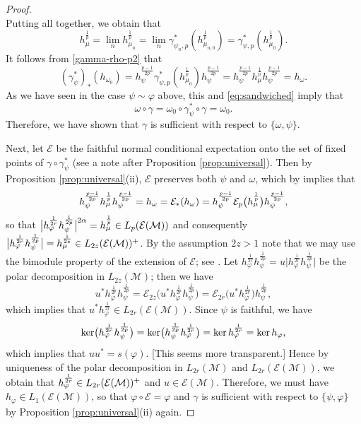 \documentclass[12pt]{article}
\theoremstyle{definition}
\theoremstyle{remark}
\numberwithin{equation}{section}
\def\cE{\mathcal E}
\def\Me{\mathcal M}
\def\ffi{\varphi}
\begin{document}
\begin{proof}
\[\]
Putting all together, we obtain that 
\[
h_\mu^{\frac1p}=\lim_n h_{\mu_n}^{\frac1p}=\lim_n
\gamma^*_{\psi_{n},p}(h_{\mu_{n,0}}^{\frac1p})=\gamma^*_{\psi,p}(h_{\mu_0}^{\frac1p}).
\]
It follows from \eqref{gamma-rho-p2} that 
\[
(\gamma^*_{\psi})_*(h_{\omega_0})=
h_{\psi}^{\frac{p-1}{2p}}\gamma^*_{\psi,p}(h_{\mu_0}^{\frac1p})h_{\psi}^{\frac{p-1}{2p}}=
h_{\psi}^{\frac{p-1}{2p}}h_\mu^{\frac1p}h_{\psi}^{\frac{p-1}{2p}}=h_\omega.
\]
As we have seen {\color{red}in the case $\psi\sim \ffi$ above,} this and \eqref{eq:sandwiched} imply that
\[
\omega\circ\gamma= \omega_0\circ \gamma_\psi^*\circ\gamma=\omega_0.
\]
{\color{red}Therefore, we have shown that $\gamma$ is sufficient with respect to $\{\omega,\psi\}$.}

Next, let $\mathcal E$ be the faithful  normal conditional expectation onto the
set of fixed points of $\gamma\circ\gamma^*_\psi$ (see a note after Proposition \ref{prop:universal}). Then
by Proposition \ref{prop:universal}(ii), $\mathcal E$ preserves both $\psi$ and $\omega$, which by
\cite{junge2003noncommutative} implies that 
\[
h_\psi^{p-1\over 2p}h_\mu^{\frac1p}h_\psi^{p-1\over 2p}=h_\omega=\mathcal
E_*(h_\omega)=h_\psi^{p-1\over 2p}\cE_p\bigl(h_\mu^{\frac1p}\bigr)h_\psi^{p-1\over 2p},
\]
so that $\big|h_\ffi^{1\over 2r}h_\psi^{1\over 2p}\big|^{2\alpha}= h_\mu^{\frac1p}\in
L_p(\cE(\Me))$ and consequently $\big|h_\varphi^{\frac1{2r}}h_\psi^{\frac1{2p}}\big|=h_\mu^{1\over
2z}\in L_{2z}(\mathcal E(\Me))^+$. By the assumption $2z>1$ note that we may use the
{\color{red}bimodule property} of the extension of $\mathcal E$; {\color{red}see
\cite[Proposition 2.3(ii)]{junge2003noncommutative}.}
Let  $h_\varphi^{\frac1{2r}}h_\psi^{\frac1{2p}}=u\big|h_\varphi^{\frac1{2r}}h_\psi^{\frac1{2p}}\big|$ be the
polar decomposition in $L_{2z}(\Me)$; then we have 
\[
u^*h_\varphi^{\frac1{2r}}h_\psi^{\frac1{2p}}=\mathcal
E_{2z}\bigl(u^*h_\varphi^{\frac1{2r}}h_\psi^{\frac1{2p}}\bigr)=\mathcal
E_{2r}\bigl(u^*h_\varphi^{\frac1{2r}}\bigr)h_\psi^{\frac1{2p}},
\]
which implies that $u^*h_\varphi^{\frac1{2r}}\in L_{2r}(\cE(\Me))$. Since $\psi$ is
faithful, we have
{\color{red}
\[
\ker\bigl(h_\ffi^{1\over2r}h_\psi^{1\over2p}\bigr)=\ker\bigl(h_\psi^{1\over2p}h_\ffi^{1\over2r}\bigr)
=\ker h_\ffi^{1\over2r}=\ker h_\ffi,
\]
which implies that $uu^*=s(\ffi)$. [This seems more transparent.]}
Hence by uniqueness of the polar decomposition in $L_{2r}(\Me)$ and $L_{2r}(\cE(\Me))$,
we obtain that $h_\ffi^{1\over 2r}\in L_{2r}(\cE(\Me))^+$ and $u\in \cE(\Me)$. 
Therefore, we must have $h_\ffi\in L_1(\cE(\Me))$, so that $\ffi\circ\mathcal E=\ffi$ and $\gamma$ is
sufficient with respect to $\{\psi,\varphi\}$ by Proposition \ref{prop:universal}(ii) again.
\end{proof}
\end{document}
